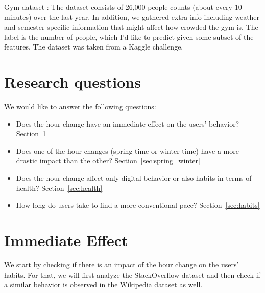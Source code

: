 \documentclass[11pt]{article}
\begin{document}
Gym dataset : The dataset consists of 26,000 people counts (about every 10 minutes) over the last year. In addition, we gathered extra info including weather and semester-specific information that might affect how crowded the gym is. The label is the number of people, which I'd like to predict given some subset of the features. The dataset was taken from a Kaggle challenge.

\section*{Research questions}

We would like to answer the following questions:\\
\begin{itemize}
\item Does the hour change have an immediate effect on the users' behavior? Section~\ref{sec:effect}
\item Does one of the hour changes (spring time or winter time) have a more drastic impact than the other? Section~\ref{sec:spring_winter}
\item Does the hour change affect only digital behavior or also habits in terms of health? Section~\ref{sec:health}
\item How long do users take to find a more conventional pace? Section~\ref{sec:habits}
\end{itemize}

\section{Immediate Effect}
\label{sec:effect}

We start by checking if there is an impact of the hour change on the users' habits. For that, we will first analyze the StackOverflow dataset and then check if a similar behavior is observed in the Wikipedia dataset as well.\\
\end{document}
